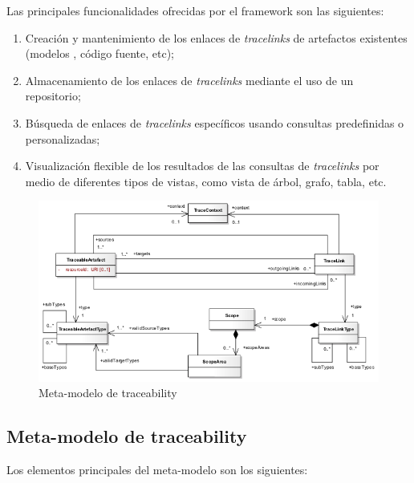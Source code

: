 \documentclass[a4paper,12pt,oneside,spanish]{book}
\begin{document}
Las principales funcionalidades ofrecidas por el framework son las siguientes:

\begin{enumerate}
\item Creación y mantenimiento de los enlaces de \textit{tracelinks} de artefactos existentes (modelos , código fuente, etc);
\item Almacenamiento de los enlaces de \textit{tracelinks} mediante el uso de un repositorio;
\item Búsqueda de enlaces de \textit{tracelinks} específicos usando consultas predefinidas o personalizadas;
\item Visualización flexible de los resultados de las consultas de \textit{tracelinks} por medio de diferentes tipos de vistas, como vista de árbol, grafo, tabla, etc.
\end{enumerate}

\begin{figure}[hbtp]
\centering
\includegraphics[scale=.62]{./img/Traceability_Metamodel}
\caption{Meta-modelo de traceability}
\label{fig:SPLMeta-modelo}
\end{figure}

\subsection{Meta-modelo de traceability}

Los elementos principales del meta-modelo son los siguientes:
\end{document}
